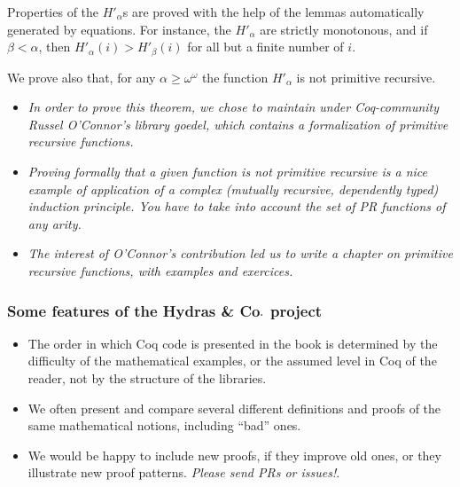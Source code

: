 \documentclass[10pt]{beamer}
\newcommand{\coq}{Coq\xspace}
\newcommand{\community}{Coq-community\xspace}
\newcommand{\Hydras}{Hydras \& Co$\text.$\xspace}
\begin{document}
\begin{frame}
  \begin{block}{}
    
    Properties of the \textcolor{mathcolor}{$H'_\alpha$}s are proved with the help of the lemmas automatically generated by \textcolor{plugincolor}{equations}. For instance, the \textcolor{mathcolor}{$H'_\alpha$} are strictly monotonous, 
and if \textcolor{mathcolor}{$\beta<\alpha$}, then \textcolor{mathcolor}{$H'_\alpha(i)>H'_\beta(i)$} for all but a finite number of $i$.
  \end{block}

  
  \begin{block}{}
    We prove also that, for any   \textcolor{mathcolor}{$\alpha\geq\omega^\omega$} the function \textcolor{mathcolor}{$H'_\alpha$} is not primitive recursive.

    \begin{itemize}
    \item \emph{In order to prove this theorem, we chose to maintain under \community Russel O'Connor's library \textcolor{plugincolor}{goedel}, which contains a formalization of primitive recursive functions.}
    \item \emph{Proving formally that a given function is not primitive recursive is a nice example of application of a complex (mutually recursive, dependently typed) induction principle. You have to take into account the set of PR functions of any arity.}
      
        \item    \emph{The interest of O'Connor's contribution led us to write a chapter on primitive recursive functions, with examples and exercices.}
    \end{itemize}
  \end{block}
\end{frame}

\begin{frame}
  \frametitle{Some features of the \Hydras project}
  \begin{block}{}
    \begin{itemize}
    \item The order in which \coq code is presented in the book is determined by the difficulty of the mathematical examples, or the assumed level in \coq of the reader, not by the structure of the libraries.
    \item We often present and compare several different definitions and proofs of the same mathematical notions, including ``bad'' ones.
      \item We would be happy to include new proofs, if they improve old ones, or they illustrate new proof patterns. \emph{Please send PRs or issues!}.
    \end{itemize}
  \end{block}
\end{frame}
 
\end{document}
